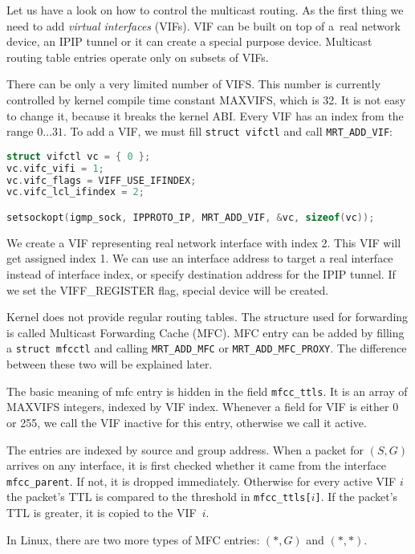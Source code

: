Let us have a look on how to control the multicast routing. As the first thing
we need to add \emph{virtual interfaces} (VIFs). VIF can be built on top of
a~real network device, an IPIP tunnel or it can create a special purpose device.
Multicast routing table entries operate only on subsets of VIFs.

There can be only a very limited number of VIFS. This number is currently
controlled by kernel compile time constant MAXVIFS, which is 32. It is not easy
to change it, because it breaks the kernel ABI. Every VIF has an index from the
range $0\dots31$. To add a VIF, we must fill \texttt{struct vifctl} and call
\texttt{MRT\_ADD\_VIF}:

\begin{lstlisting}[language=c]
struct vifctl vc = { 0 };
vc.vifc_vifi = 1;
vc.vifc_flags = VIFF_USE_IFINDEX;
vc.vifc_lcl_ifindex = 2;

setsockopt(igmp_sock, IPPROTO_IP, MRT_ADD_VIF, &vc, sizeof(vc));
\end{lstlisting}

We create a VIF representing real network interface with index 2. This VIF will
get assigned index 1. We can use an interface address to target a real
interface instead of interface index, or specify destination address for the
IPIP tunnel. If we set the VIFF\_REGISTER flag, special device will be created.

Kernel does not provide regular routing tables. The structure used for
forwarding is called Multicast Forwarding Cache (MFC). MFC entry can be added
by filling a \texttt{struct mfcctl} and calling \texttt{MRT\_ADD\_MFC} or
\texttt{MRT\_ADD\_MFC\_PROXY}. The difference between these two will be
explained later.


The basic meaning of mfc entry is hidden in the field \texttt{mfcc\_ttls}. It is
an array of MAXVIFS integers, indexed by VIF index. Whenever a field for VIF is
either 0 or 255, we call the VIF inactive for this entry, otherwise we call it
active.

The entries are indexed by source and group address. When a packet for $(S,G)$
arrives on any interface, it is first checked whether it came from the
interface \texttt{mfcc\_parent}. If not, it is dropped immediately. Otherwise
for every active VIF $i$ the packet's TTL is compared to the threshold in
\texttt{mfcc\_ttls[$i$]}. If the packet's TTL is greater, it is copied to the
VIF~$i$.

In Linux, there are two more types of MFC entries: $(*, G)$ and $(*,*)$.
